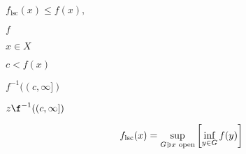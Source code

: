 \documentclass[10pt]{book}
\begin{document}
\begin{mdSnippets}
\begin{mdInlineSnippet}[2a1cb0faeaae36f22fe0e05e9f3b5871]%
$f_\text{lsc}(x) \le f(x),$\end{mdInlineSnippet}%
\begin{mdInlineSnippet}%
$f$\end{mdInlineSnippet}%
\begin{mdInlineSnippet}[4202025ca33a0244467654fcec511b07]%
$x \in X$\end{mdInlineSnippet}%
\begin{mdInlineSnippet}[e548ff08c63cd6956859e27f4d55c442]%
$c < f(x)$\end{mdInlineSnippet}%
\begin{mdInlineSnippet}[bd9a25206d9dd30b4167e1768fd7f67f]%
$f^{-1}((c, \infty])$\end{mdInlineSnippet}%
\begin{mdInlineSnippet}[840b7aaf273d408735e6ec1173cd35a2]%
$z \f^{-1}((c, \infty])$\end{mdInlineSnippet}%
\begin{mdDisplaySnippet}[c6054d0f8b02754c25bdb53421a42bd4]%
\[%
f_\text{lsc}(x) = \sup_{G \ni x \text{ open}} \qty[\inf_{y \in G} f(y)]
\]%
\end{mdDisplaySnippet}%

\end{mdSnippets}
\end{document}
